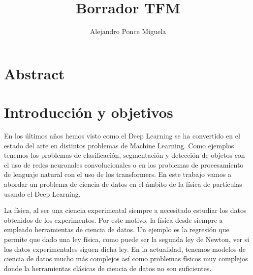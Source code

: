 \documentclass[a4paper,12pt,twoside,titlepage]{article}
\author{Alejandro Ponce Miguela}
\date{}
\title{\textbf{Borrador TFM}}
\begin{document}
\maketitle
\tableofcontents
\newpage

\section*{Abstract}

\newpage

\section{Introducción y objetivos}


En los últimos años hemos visto como el Deep Learning se ha convertido en el estado del arte en distintos problemas de Machine Learning. Como ejemplos tenemos los problemas de clasificación, segmentación y detección de objetos con el uso de redes neuronales convolucionales o en los problemas de procesamiento de lenguaje natural con el uso de los transformers. En este trabajo vamos a abordar un problema de ciencia de datos en el ámbito de la física de partículas usando el Deep Learning.

La física, al ser una ciencia experimental siempre a necesitado estudiar los datos obtenidos de los experimentos. Por este motivo, la física desde siempre a empleado herramientas de ciencia de datos. Un ejemplo es la regresión que permite que dado una ley física, como puede ser la segunda ley de Newton, ver si los datos experimentales siguen dicha ley. En la actualidad, tenemos modelos de ciencia de datos mucho más complejos así como problemas físicos muy complejos donde la herramientas clásicas de ciencia de datos no son suficientes.
\end{document}

